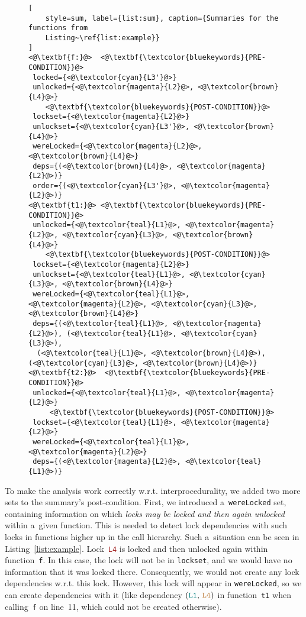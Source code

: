 \documentclass[runningheads]{llncs}
\begin{document}
\begin{wrapfigure}{l}{.34 \textwidth}
\vspace*{-2em}
\begin{lstlisting}[
    style=sum, label={list:sum}, caption={Summaries for the functions from
    Listing~\ref{list:example}}
]
<@\textbf{f:}@>  <@\textbf{\textcolor{bluekeywords}{PRE-CONDITION}}@>
 locked={<@\textcolor{cyan}{L3'}@>}
 unlocked={<@\textcolor{magenta}{L2}@>, <@\textcolor{brown}{L4}@>}
    <@\textbf{\textcolor{bluekeywords}{POST-CONDITION}}@>
 lockset={<@\textcolor{magenta}{L2}@>}
 unlockset={<@\textcolor{cyan}{L3'}@>, <@\textcolor{brown}{L4}@>}
 wereLocked={<@\textcolor{magenta}{L2}@>, <@\textcolor{brown}{L4}@>}
 deps={(<@\textcolor{brown}{L4}@>, <@\textcolor{magenta}{L2}@>)}
 order={(<@\textcolor{cyan}{L3'}@>, <@\textcolor{magenta}{L2}@>)}
<@\textbf{t1:}@> <@\textbf{\textcolor{bluekeywords}{PRE-CONDITION}}@>
 unlocked={<@\textcolor{teal}{L1}@>, <@\textcolor{magenta}{L2}@>, <@\textcolor{cyan}{L3}@>, <@\textcolor{brown}{L4}@>}
    <@\textbf{\textcolor{bluekeywords}{POST-CONDITION}}@>
 lockset={<@\textcolor{magenta}{L2}@>}
 unlockset={<@\textcolor{teal}{L1}@>, <@\textcolor{cyan}{L3}@>, <@\textcolor{brown}{L4}@>}
 wereLocked={<@\textcolor{teal}{L1}@>, <@\textcolor{magenta}{L2}@>, <@\textcolor{cyan}{L3}@>, <@\textcolor{brown}{L4}@>}
 deps={(<@\textcolor{teal}{L1}@>, <@\textcolor{magenta}{L2}@>), (<@\textcolor{teal}{L1}@>, <@\textcolor{cyan}{L3}@>),
  (<@\textcolor{teal}{L1}@>, <@\textcolor{brown}{L4}@>), (<@\textcolor{cyan}{L3}@>, <@\textcolor{brown}{L4}@>)}
<@\textbf{t2:}@>  <@\textbf{\textcolor{bluekeywords}{PRE-CONDITION}}@>
 unlocked={<@\textcolor{teal}{L1}@>, <@\textcolor{magenta}{L2}@>}
     <@\textbf{\textcolor{bluekeywords}{POST-CONDITION}}@>
 lockset={<@\textcolor{teal}{L1}@>, <@\textcolor{magenta}{L2}@>}
 wereLocked={<@\textcolor{teal}{L1}@>, <@\textcolor{magenta}{L2}@>}
 deps={(<@\textcolor{magenta}{L2}@>, <@\textcolor{teal}{L1}@>)}
\end{lstlisting}
\vspace*{-2em}
\end{wrapfigure}

To make the analysis work correctly w.r.t. interprocedurality, we added
two more sets to the summary's post-condition. First, we introduced
a~\texttt{wereLocked} set, containing information on which \emph{locks
may be locked and then again unlocked} within a~given function. This is
needed to detect lock dependencies with such locks in functions higher up
in the call hierarchy. Such a~situation can be seen in
Listing~\ref{list:example}. Lock~\texttt{\textcolor{brown}{L4}} is locked
and then unlocked again within function~\texttt{f}. In this case, the
lock will not be in \texttt{lockset}, and we would have no information
that it was locked there. Consequently, we would not create any lock
dependencies w.r.t. this lock. However, this lock will appear
in \texttt{wereLocked}, so we can create dependencies with it (like
dependency $ (\text{\texttt{\textcolor{teal}{L1}},
\texttt{\textcolor{brown}{L4}}}) $ in function~\texttt{t1} when
calling~\texttt{f} on line~11, which could not be created otherwise).
\end{document}
